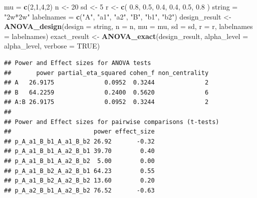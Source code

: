 \documentclass[
]{book}
\newenvironment{Shaded}{\begin{snugshade}}{\end{snugshade}}
\newcommand{\DataTypeTok}[1]{\textcolor[rgb]{0.13,0.29,0.53}{#1}}
\newcommand{\DecValTok}[1]{\textcolor[rgb]{0.00,0.00,0.81}{#1}}
\newcommand{\FloatTok}[1]{\textcolor[rgb]{0.00,0.00,0.81}{#1}}
\newcommand{\KeywordTok}[1]{\textcolor[rgb]{0.13,0.29,0.53}{\textbf{#1}}}
\newcommand{\NormalTok}[1]{#1}
\newcommand{\OperatorTok}[1]{\textcolor[rgb]{0.81,0.36,0.00}{\textbf{#1}}}
\newcommand{\OtherTok}[1]{\textcolor[rgb]{0.56,0.35,0.01}{#1}}
\newcommand{\StringTok}[1]{\textcolor[rgb]{0.31,0.60,0.02}{#1}}
\begin{document}
\begin{Shaded}
\begin{Highlighting}[]
\NormalTok{mu =}\StringTok{ }\KeywordTok{c}\NormalTok{(}\DecValTok{2}\NormalTok{,}\DecValTok{1}\NormalTok{,}\DecValTok{4}\NormalTok{,}\DecValTok{2}\NormalTok{)}
\NormalTok{n <-}\StringTok{ }\DecValTok{20}
\NormalTok{sd <-}\StringTok{ }\DecValTok{5}
\NormalTok{r <-}\StringTok{ }\KeywordTok{c}\NormalTok{(}
  \FloatTok{0.8}\NormalTok{, }\FloatTok{0.5}\NormalTok{, }\FloatTok{0.4}\NormalTok{,}
  \FloatTok{0.4}\NormalTok{, }\FloatTok{0.5}\NormalTok{,}
  \FloatTok{0.8}
\NormalTok{)}
\NormalTok{string =}\StringTok{ "2w*2w"}
\NormalTok{labelnames =}\StringTok{ }\KeywordTok{c}\NormalTok{(}\StringTok{"A"}\NormalTok{, }\StringTok{"a1"}\NormalTok{, }\StringTok{"a2"}\NormalTok{, }\StringTok{"B"}\NormalTok{, }\StringTok{"b1"}\NormalTok{, }\StringTok{"b2"}\NormalTok{)}
\NormalTok{design_result <-}\StringTok{ }\KeywordTok{ANOVA_design}\NormalTok{(}\DataTypeTok{design =}\NormalTok{ string,}
                              \DataTypeTok{n =}\NormalTok{ n,}
                              \DataTypeTok{mu =}\NormalTok{ mu,}
                              \DataTypeTok{sd =}\NormalTok{ sd,}
                              \DataTypeTok{r =}\NormalTok{ r,}
                              \DataTypeTok{labelnames =}\NormalTok{ labelnames)}
\NormalTok{exact_result <-}\StringTok{ }\KeywordTok{ANOVA_exact}\NormalTok{(design_result,}
                            \DataTypeTok{alpha_level =}\NormalTok{ alpha_level,}
                            \DataTypeTok{verbose =} \OtherTok{TRUE}\NormalTok{)}
\end{Highlighting}
\end{Shaded}

\begin{verbatim}
## Power and Effect sizes for ANOVA tests
##       power partial_eta_squared cohen_f non_centrality
## A   26.9175              0.0952  0.3244              2
## B   64.2259              0.2400  0.5620              6
## A:B 26.9175              0.0952  0.3244              2
## 
## Power and Effect sizes for pairwise comparisons (t-tests)
##                       power effect_size
## p_A_a1_B_b1_A_a1_B_b2 26.92       -0.32
## p_A_a1_B_b1_A_a2_B_b1 39.70        0.40
## p_A_a1_B_b1_A_a2_B_b2  5.00        0.00
## p_A_a1_B_b2_A_a2_B_b1 64.23        0.55
## p_A_a1_B_b2_A_a2_B_b2 13.60        0.20
## p_A_a2_B_b1_A_a2_B_b2 76.52       -0.63
\end{verbatim}

\begin{Shaded}
\end{Shaded}
\end{document}
